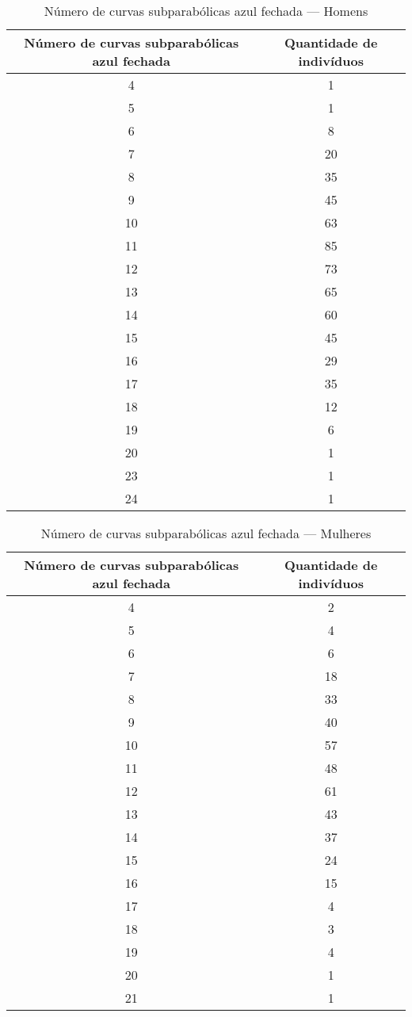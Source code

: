 \documentclass[a4paper,12pt]{article}
\begin{document}
\begin{table}[h!]
\centering
\caption{Número de curvas subparabólicas azul fechada — Homens}
\begin{tabular}{c c}
\hline
\textbf{Número de curvas subparabólicas azul fechada} & \textbf{Quantidade de indivíduos} \\ 
\hline
4  & 1  \\
5  & 1  \\
6  & 8  \\
7  & 20 \\
8  & 35 \\
9  & 45 \\
10 & 63 \\
11 & 85 \\
12 & 73 \\
13 & 65 \\
14 & 60 \\
15 & 45 \\
16 & 29 \\
17 & 35 \\
18 & 12 \\
19 & 6  \\
20 & 1  \\
23 & 1  \\
24 & 1  \\
\hline
\end{tabular}
\end{table}


\begin{table}[h!]
\centering
\caption{Número de curvas subparabólicas azul fechada — Mulheres}
\begin{tabular}{c c}
\hline
\textbf{Número de curvas subparabólicas azul fechada} & \textbf{Quantidade de indivíduos} \\ 
\hline
4  & 2  \\
5  & 4  \\
6  & 6  \\
7  & 18 \\
8  & 33 \\
9  & 40 \\
10 & 57 \\
11 & 48 \\
12 & 61 \\
13 & 43 \\
14 & 37 \\
15 & 24 \\
16 & 15 \\
17 & 4  \\
18 & 3  \\
19 & 4  \\
20 & 1  \\
21 & 1  \\
\hline
\end{tabular}
\end{table}
\end{document}
